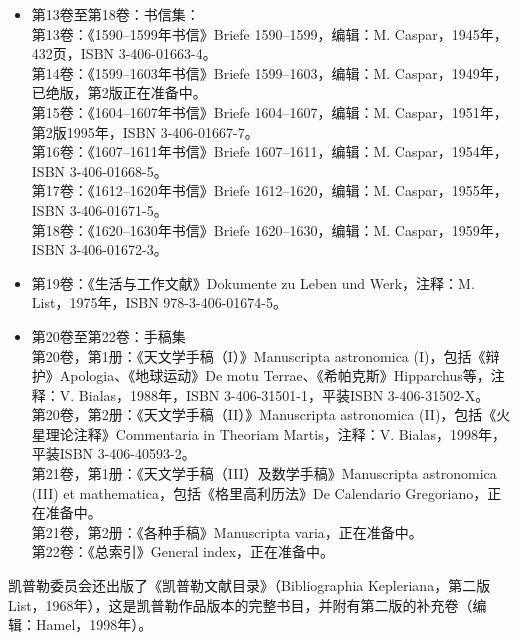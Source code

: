 \begin{itemize}
\item 第13卷至第18卷：书信集：\\
第13卷：《1590–1599年书信》Briefe 1590–1599，编辑：M. Caspar，1945年，432页，ISBN 3-406-01663-4。\\
第14卷：《1599–1603年书信》Briefe 1599–1603，编辑：M. Caspar，1949年，已绝版，第2版正在准备中。\\
第15卷：《1604–1607年书信》Briefe 1604–1607，编辑：M. Caspar，1951年，第2版1995年，ISBN 3-406-01667-7。\\
第16卷：《1607–1611年书信》Briefe 1607–1611，编辑：M. Caspar，1954年，ISBN 3-406-01668-5。\\
第17卷：《1612–1620年书信》Briefe 1612–1620，编辑：M. Caspar，1955年，ISBN 3-406-01671-5。\\
 第18卷：《1620–1630年书信》Briefe 1620–1630，编辑：M. Caspar，1959年，ISBN 3-406-01672-3。\\

\item 第19卷：《生活与工作文献》Dokumente zu Leben und Werk，注释：M. List，1975年，ISBN 978-3-406-01674-5。

\item 第20卷至第22卷：手稿集\\
第20卷，第1册：《天文学手稿（I）》Manuscripta astronomica (I)，包括《辩护》Apologia、《地球运动》De motu Terrae、《希帕克斯》Hipparchus等，注释：V. Bialas，1988年，ISBN 3-406-31501-1，平装ISBN 3-406-31502-X。\\
第20卷，第2册：《天文学手稿（II）》Manuscripta astronomica (II)，包括《火星理论注释》Commentaria in Theoriam Martis，注释：V. Bialas，1998年，平装ISBN 3-406-40593-2。\\
第21卷，第1册：《天文学手稿（III）及数学手稿》Manuscripta astronomica (III) et mathematica，包括《格里高利历法》De Calendario Gregoriano，正在准备中。\\
第21卷，第2册：《各种手稿》Manuscripta varia，正在准备中。\\
第22卷：《总索引》General index，正在准备中。\\
\end{itemize}
凯普勒委员会还出版了《凯普勒文献目录》（Bibliographia Kepleriana，第二版List，1968年），这是凯普勒作品版本的完整书目，并附有第二版的补充卷（编辑：Hamel，1998年）。